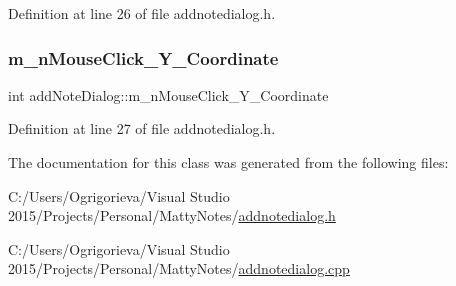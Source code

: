 Definition at line 26 of file addnotedialog.\+h.

\hypertarget{classaddNoteDialog_aeb0351ab1bbcc76899f21224ddf4d374}{}\label{classaddNoteDialog_aeb0351ab1bbcc76899f21224ddf4d374} 
\subsubsection{\texorpdfstring{m\+\_\+n\+Mouse\+Click\+\_\+\+Y\+\_\+\+Coordinate}{m\_nMouseClick\_Y\_Coordinate}}
{\footnotesize\ttfamily int add\+Note\+Dialog\+::m\+\_\+n\+Mouse\+Click\+\_\+\+Y\+\_\+\+Coordinate\hspace{0.3cm}{\ttfamily [private]}}



Definition at line 27 of file addnotedialog.\+h.



The documentation for this class was generated from the following files\+:\begin{DoxyCompactItemize}
\item 
C\+:/\+Users/\+Ogrigorieva/\+Visual Studio 2015/\+Projects/\+Personal/\+Matty\+Notes/\hyperlink{addnotedialog_8h}{addnotedialog.\+h}\item 
C\+:/\+Users/\+Ogrigorieva/\+Visual Studio 2015/\+Projects/\+Personal/\+Matty\+Notes/\hyperlink{addnotedialog_8cpp}{addnotedialog.\+cpp}\end{DoxyCompactItemize}
